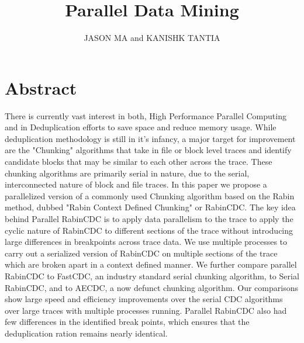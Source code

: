 \documentclass{acmtog} %
\begin{document}
	\title{Parallel Data Mining} %
	
	\author{JASON MA {\upshape and} KANISHK TANTIA
		}
	

	
	\maketitle
	\section{Abstract}
	There is currently vast interest in both, High Performance Parallel Computing and in Deduplication efforts to save space and reduce memory usage. While deduplication methodology is still in it's infancy, a major target for improvement are the "Chunking" algorithms that take in file or block level traces and identify candidate blocks that may be similar to each other across the trace. These chunking algorithms are primarily serial in nature, due to the serial, interconnected nature of block and file traces. In this paper we propose a parallelized version of a commonly used Chunking algorithm based on the Rabin method, dubbed "Rabin Context Defined Chunking" or RabinCDC. The key idea behind Parallel RabinCDC is to apply data parallelism to the trace to apply the cyclic nature of RabinCDC to different sections of the trace without introducing large differences in breakpoints across trace data. We use multiple processes to carry out a serialized version of RabinCDC on multiple sections of the trace which are broken apart in a context defined manner. We further compare parallel RabinCDC to FastCDC, an industry standard serial chunking algorithm, to Serial RabinCDC, and to AECDC, a now defunct chunking algorithm. Our comparisons show large speed and efficiency improvements over the serial CDC algorithms over large traces with multiple processes running. Parallel RabinCDC also had few differences in the identified break points, which ensures that the deduplication ration remains nearly identical.
	
\end{document}
